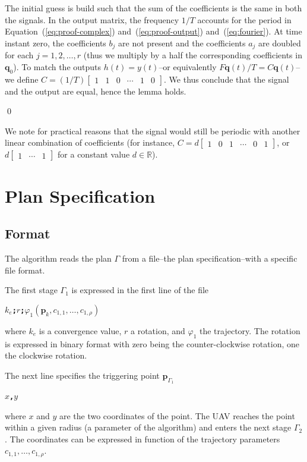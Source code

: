 \documentclass[letterpaper,10pt,conference]{ieeeconf}
\theoremstyle{definition}
\begin{document}
The initial guess is build such that the sum of the coefficients is the same in both the signals. In the output matrix, the frequency $1/T$ accounts for the period in Equation~(\ref{eq:proof-complex}) and~(\ref{eq:proof-output}) and~(\ref{eq:fourier}). At time instant zero, the coefficients $b_j$ are not present and the coefficients $a_j$ are doubled for each $j=1,2,\dots,r$ (thus we multiply by a half the corresponding coefficients in $\mathbf{q}_0$). To match the outputs $h(t)=y(t)$--or equivalently $F\mathbf{q}(t)/T=C\mathbf{q}(t)$--we define $C=(1/T)\begin{bmatrix}1 & 1 & 0 & \cdots & 1 & 0\end{bmatrix}$. We thus conclude that the signal and the output are equal, hence the lemma holds.

\qed

We note for practical reasons that the signal would still be periodic with another linear combination of coefficients (for instance, $C=d\begin{bmatrix}1 & 0 & 1 & \cdots & 0 & 1\end{bmatrix}$, or $d\begin{bmatrix}1 & \cdots & 1\end{bmatrix}$ for a constant value $d\in\mathbb{R}$).


\section{Plan Specification}
\label{app:plan-spec}

\subsection{Format}

The algorithm reads the plan $\Gamma$ from a file--the plan specification--with a specific file format.

The first stage $\Gamma_1$ is expressed in the first line of the file
\begin{algorithmic}[1]
  \STATE\textbf{\texttt{$k_e$;$r$;$\varphi_1(\mathbf{p}_k,c_{1,1},\dots,c_{1,\rho})$}}\label{code:stage}
\end{algorithmic}
where $k_e$ is a convergence value, $r$ a rotation, and $\varphi_1$ the trajectory. The rotation is expressed in binary format with zero being the counter-clockwise rotation, one the clockwise rotation.

The next line specifies the triggering point $\mathbf{p}_{\Gamma_1}$
\begin{algorithmic}[1]
  \STATE\textbf{\texttt{$x$,$y$}}\label{code:trigger-pt}
\end{algorithmic}
where $x$ and $y$ are the two coordinates of the point. The UAV reaches the point within a given radius (a parameter of the algorithm) and enters the next stage $\Gamma_2$. The coordinates can be expressed in function of the trajectory parameters $c_{1,1},\dots,c_{1,\rho}$.
\end{document}
